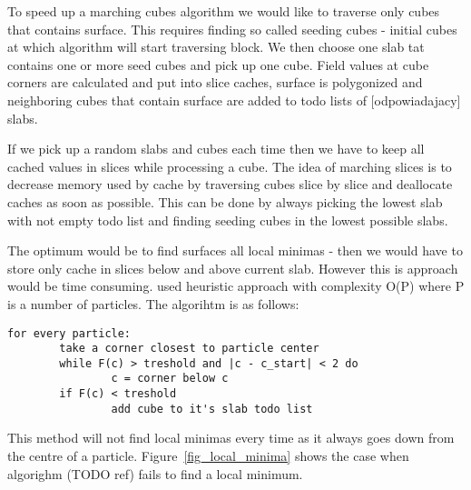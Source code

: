 To speed up a marching cubes algorithm we would like to traverse only cubes that contains surface. This requires finding so called seeding cubes - initial cubes at which algorithm will start traversing block. We then choose one slab tat contains one or more seed cubes and pick up one cube. Field values at cube corners are calculated and put into slice caches, surface is polygonized and neighboring cubes that contain surface are added to todo lists of [odpowiadajacy] slabs. 

If we pick up a random slabs and cubes each time then we have to keep all cached values in slices while processing a cube. The idea of marching slices is to decrease memory used by cache by traversing cubes slice by slice and deallocate caches as soon as possible. This can be done by always picking the lowest slab with not empty todo list and finding seeding cubes in the lowest possible slabs. 

The optimum would be to find surfaces all local minimas - then we would have to store only cache in slices below and above current slab. However this is approach would be time consuming. \cite{RosenbergBirdwell2008} used heuristic approach with complexity O(P) where P is a number of particles. The algorihtm is as follows:
\begin{verbatim}
for every particle:
        take a corner closest to particle center
        while F(c) > treshold and |c - c_start| < 2 do
                c = corner below c
        if F(c) < treshold
                add cube to it's slab todo list
\end{verbatim}

This method will not find local minimas every time as it always goes down from the centre of a particle. Figure~\ref{fig_local_minima} shows the case when algorighm (TODO ref) fails to find a local minimum. 


